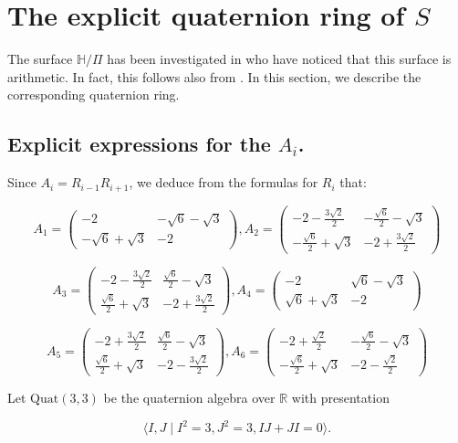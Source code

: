 \documentclass[12pt]{amsart}
\newcommand{\HP}{\mathbb{H}}
\newcommand{\R}{\mathbb{R}}
\newcommand{\Quat}{{\mathrm {Quat}}}
\begin{document}
\section{The explicit quaternion ring of $S$}

The surface $\HP/\Pi$ has been investigated 
in \cite{KuuNaa} who have noticed that this surface is arithmetic. In fact, this follows also from
\cite{Takeuchi}. In this section, we describe the 
corresponding quaternion ring.


\subsection{Explicit expressions for the $A_i$.}

Since $A_i=R_{i-1}R_{i+1}$, we deduce from the
formulas for $R_i$ that:

$$A_1=\begin{pmatrix}
-2 &-\sqrt{6}-\sqrt{3}\\
-\sqrt{6}+\sqrt{3}&-2
\end{pmatrix},
A_2=\begin{pmatrix}
-2-\frac{3\sqrt{2}}{2}&-\frac{\sqrt{6}}{2}-\sqrt{3}\\
-\frac{\sqrt{6}}{2}+\sqrt{3}&-2+\frac{3\sqrt{2}}{2}\end{pmatrix}$$

$$A_3=\begin{pmatrix}
-2-\frac{3\sqrt{2}}{2}&\frac{\sqrt{6}}{2}-\sqrt{3}\\
\frac{\sqrt{6}}{2}+\sqrt{3}&-2+\frac{3\sqrt{2}}{2}\end{pmatrix},
A_4=\begin{pmatrix}
-2 &\sqrt{6}-\sqrt{3}\\
\sqrt{6}+\sqrt{3}&-2
\end{pmatrix}$$


$$A_5=\begin{pmatrix}
-2+\frac{3\sqrt{2}}{2}&\frac{\sqrt{6}}{2}-\sqrt{3}\\
\frac{\sqrt{6}}{2}+\sqrt{3}&-2-\frac{3\sqrt{2}}{2}\end{pmatrix},
A_6=\begin{pmatrix}
-2+\frac{\sqrt{2}}{2} &-\frac{\sqrt{6}}{2}-\sqrt{3}\\
-\frac{\sqrt{6}}{2}+\sqrt{3}&-2-\frac{\sqrt{2}}{2}
\end{pmatrix}$$

Let $\Quat(3,3)$ be the quaternion algebra over $\R$ with presentation

$$\langle I, J\mid I^2=3, J^2=3, IJ+JI=0\rangle.$$
\end{document}
